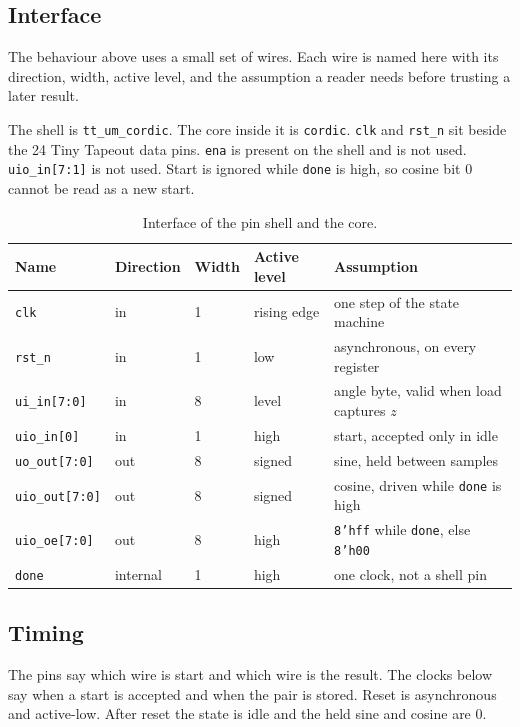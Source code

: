 \documentclass[11pt,a4paper]{article}
\begin{document}
\subsection{Interface}
The behaviour above uses a small set of wires. Each wire is named here with its direction, width, active level, and the assumption a reader needs before trusting a later result.

The shell is \texttt{tt\_um\_cordic}. The core inside it is \texttt{cordic}. \texttt{clk} and \texttt{rst\_n} sit beside the 24 Tiny Tapeout data pins. \texttt{ena} is present on the shell and is not used. \texttt{uio\_in[7:1]} is not used. Start is ignored while \texttt{done} is high, so cosine bit 0 cannot be read as a new start.

\begin{table}[ht]
\centering
\caption{Interface of the pin shell and the core.}
\label{tab:interface}
\begin{tabular}{lllll}
\toprule
Name & Direction & Width & Active level & Assumption \\
\midrule
\texttt{clk} & in & 1 & rising edge & one step of the state machine \\
\texttt{rst\_n} & in & 1 & low & asynchronous, on every register \\
\texttt{ui\_in[7:0]} & in & 8 & level & angle byte, valid when load captures \(z\) \\
\texttt{uio\_in[0]} & in & 1 & high & start, accepted only in idle \\
\texttt{uo\_out[7:0]} & out & 8 & signed & sine, held between samples \\
\texttt{uio\_out[7:0]} & out & 8 & signed & cosine, driven while \texttt{done} is high \\
\texttt{uio\_oe[7:0]} & out & 8 & high & \texttt{8'hff} while \texttt{done}, else \texttt{8'h00} \\
\texttt{done} & internal & 1 & high & one clock, not a shell pin \\
\bottomrule
\end{tabular}
\end{table}

\subsection{Timing}
The pins say which wire is start and which wire is the result. The clocks below say when a start is accepted and when the pair is stored. Reset is asynchronous and active-low. After reset the state is idle and the held sine and cosine are 0.
\end{document}
